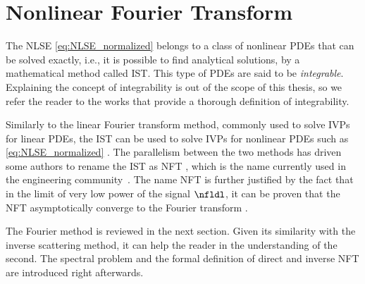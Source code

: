 \section{Nonlinear Fourier Transform}\label{sec:NFT}

The \ac{NLSE} \eqref{eq:NLSE_normalized} belongs to a class of nonlinear
\acp{PDE} that can be solved exactly, i.e., it is possible to find analytical
solutions, by a mathematical method called \ac{IST}. This type of \acp{PDE} are said to
be \textit{integrable}. Explaining the concept of integrability is out of the scope of this thesis, so we refer the reader to the works
\cite{calogero2012integrability,hitchin2013integrable} that provide a thorough
definition of integrability.

Similarly to the linear Fourier transform method, commonly used to solve
\acp{IVP} for linear \acp{PDE}, the \ac{IST} can be used to solve \acp{IVP} for
nonlinear \acp{PDE} such as \eqref{eq:NLSE_normalized} \cite{ablowitz1974inverse}. The
parallelism between the two methods has driven some authors to rename the
\ac{IST} as \ac{NFT} \cite{Yousefi2014}, which is the name currently used in the
engineering community~\cite{Turitsyn2017}. The name \ac{NFT} is further
justified by the fact that in the limit of very low power of the signal
$\nfldl$, it can be proven that the \ac{NFT} asymptotically converge to the
Fourier transform \cite{ablowitz1974inverse}.

The Fourier method is reviewed in the next section. Given its similarity with the inverse scattering method, it can help the reader in the understanding of the second. The spectral problem and the formal definition of direct and inverse \ac{NFT} are introduced right afterwards.





